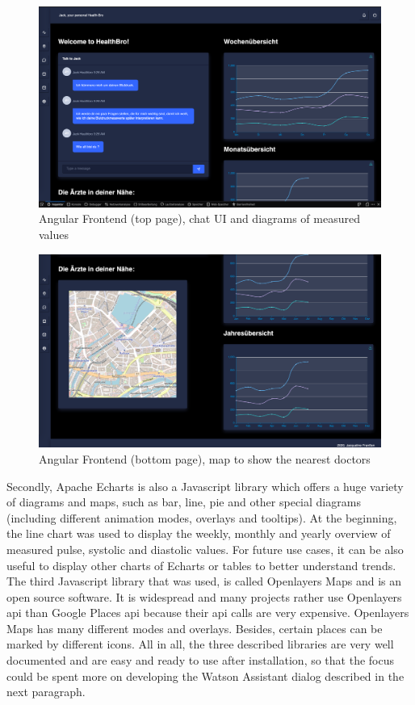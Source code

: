 \begin{figure}[h!]
	\centering
	\includegraphics[width=1\textwidth]{images/angular_01.png}
	\caption{Angular Frontend (top page), chat UI and diagrams of measured values}
	\label{angular_01}
\end{figure}
\begin{figure}[h!]
	\centering
	\includegraphics[width=1\textwidth]{images/angular_02.png}
	\caption{Angular Frontend (bottom page), map to show the nearest doctors}
	\label{angular_02}
\end{figure}

Secondly, Apache Echarts is also a Javascript library which offers a huge variety of diagrams and maps, such as bar, line, pie and other special diagrams (including different animation modes, overlays and tooltips). At the beginning, the line chart was used to display the weekly, monthly and yearly overview of measured pulse, systolic and diastolic values. For future use cases, it can be also useful to display other charts of Echarts or tables to better understand trends.
The third Javascript library that was used, is called Openlayers Maps and is an open source software. It is widespread and many projects rather use Openlayers \ac{api} than Google Places \ac{api} because their \ac{api} calls are very expensive. Openlayers Maps has many different modes and overlays. Besides, certain places can be marked by different icons.
All in all, the three described libraries are very well documented and are easy and ready to use after installation, so that the focus could be spent more on developing the Watson Assistant dialog described in the next paragraph.

